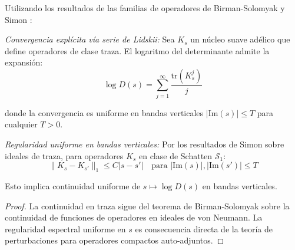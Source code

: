 \begin{lemma}
\label{lem:A4-spectral}

Utilizando los resultados de las familias de operadores de Birman-Solomyak \cite{BirmanSolomyak1967} y Simon \cite{simon2005}:

\emph{Convergencia explícita vía serie de Lidskii:}
Sea $K_s$ un núcleo suave adélico que define operadores de clase traza. El logaritmo del determinante admite la expansión:
\[
\log D(s) = \sum_{j=1}^\infty \frac{\text{tr}(K_s^j)}{j}
\]

donde la convergencia es uniforme en bandas verticales $|\text{Im}(s)| \leq T$ para cualquier $T > 0$.

\emph{Regularidad uniforme en bandas verticales:}
Por los resultados de Simon sobre ideales de traza, para operadores $K_s$ en clase de Schatten $\mathcal{S}_1$:
\[
\|K_s - K_{s'}\|_1 \leq C |s - s'| \quad \text{para } |\text{Im}(s)|, |\text{Im}(s')| \leq T
\]

Esto implica continuidad uniforme de $s \mapsto \log D(s)$ en bandas verticales.

\begin{proof}
La continuidad en traza sigue del teorema de Birman-Solomyak sobre la continuidad de funciones de operadores en ideales de von Neumann. La regularidad espectral uniforme en $s$ es consecuencia directa de la teoría de perturbaciones para operadores compactos auto-adjuntos.
\end{proof}
\end{lemma}
